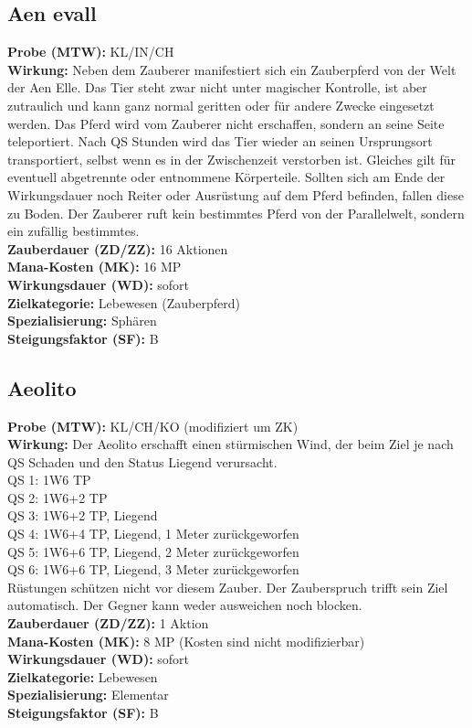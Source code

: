 \subsection{Aen evall}
\label{chap:aen_evall}
\textbf{Probe (MTW):} KL/IN/CH \\
\textbf{Wirkung:} Neben dem Zauberer manifestiert sich ein Zauberpferd von der Welt der Aen Elle. Das Tier steht zwar nicht unter magischer Kontrolle, ist aber zutraulich und kann ganz normal geritten oder für andere Zwecke eingesetzt werden. Das Pferd wird vom Zauberer nicht erschaffen, sondern an seine Seite teleportiert. Nach QS Stunden wird das Tier wieder an seinen Ursprungsort transportiert, selbst wenn es in der Zwischenzeit verstorben ist. Gleiches gilt für eventuell abgetrennte oder entnommene Körperteile. Sollten sich am Ende der Wirkungsdauer noch Reiter oder Ausrüstung auf dem Pferd befinden, fallen diese zu Boden. Der Zauberer ruft kein bestimmtes Pferd von der Parallelwelt, sondern ein zufällig bestimmtes.\\
\textbf{Zauberdauer (ZD/ZZ):} 16 Aktionen \\
\textbf{Mana-Kosten (MK):} 16 MP \\
\textbf{Wirkungsdauer (WD):} sofort \\
\textbf{Zielkategorie:} Lebewesen (Zauberpferd) \\
\textbf{Spezialisierung:} Sphären \\
\textbf{Steigungsfaktor (SF):} B


\subsection{Aeolito}
\label{chap:aeolito}
\textbf{Probe (MTW):} KL/CH/KO (modifiziert um ZK) \\
\textbf{Wirkung:} Der Aeolito erschafft einen stürmischen Wind, der beim Ziel je nach QS Schaden und den Status Liegend verursacht.\\
QS 1: 1W6 TP\\
QS 2: 1W6+2 TP\\
QS 3: 1W6+2 TP, Liegend\\
QS 4: 1W6+4 TP, Liegend, 1 Meter zurückgeworfen\\
QS 5: 1W6+6 TP, Liegend, 2 Meter zurückgeworfen\\
QS 6: 1W6+6 TP, Liegend, 3 Meter zurückgeworfen\\
Rüstungen schützen nicht vor diesem Zauber. Der Zauberspruch trifft sein Ziel automatisch. Der Gegner kann weder ausweichen noch blocken.
 \\
\textbf{Zauberdauer (ZD/ZZ):} 1 Aktion \\
\textbf{Mana-Kosten (MK):} 8 MP (Kosten sind nicht modifizierbar) \\
\textbf{Wirkungsdauer (WD):} sofort \\
\textbf{Zielkategorie:} Lebewesen \\
\textbf{Spezialisierung:} Elementar \\
\textbf{Steigungsfaktor (SF):} B


